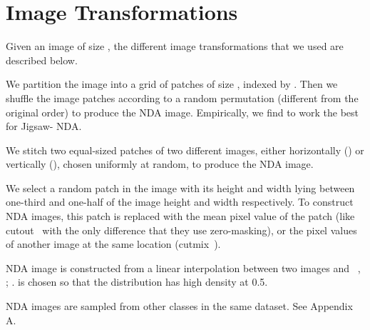 \documentclass{article} \usepackage{iclr2021_conference,times}
\begin{document}
\section{Image Transformations}
Given an image of size , the different image transformations that we used are described below.
\begin{description}
\label{sec:transformation}
    \item[Jigsaw-] \citep{noroozi2016unsupervised} We partition the image into a grid of  patches of size , indexed by . Then we shuffle the image patches according to a random permutation (different from the original order) to produce the NDA image. Empirically, we find  to work the best for Jigsaw- NDA.
    \item[Stitching] We stitch two equal-sized patches of two different images, either horizontally () or vertically (), chosen uniformly at random, to produce the NDA image.
    \item[Cutout / Cutmix] 
We select a random patch in the image with its height and width lying between one-third and one-half of the image height and width respectively. 
    To construct NDA images, this patch is replaced with the mean pixel value of the patch (like cutout~\citep{devries2017improved} with the only difference that they use zero-masking), or the pixel values of another image at the same location (cutmix~\citep{yun2019cutmix}). 
    \item[Mixup-] NDA image is constructed from a linear interpolation between two images  and ~\citep{zhang2017mixup}, ; .  is chosen so that the distribution has high density at 0.5.
    
\item[Other classes] NDA images are sampled from other classes in the same dataset. See Appendix A.

\end{description}
\end{document}
